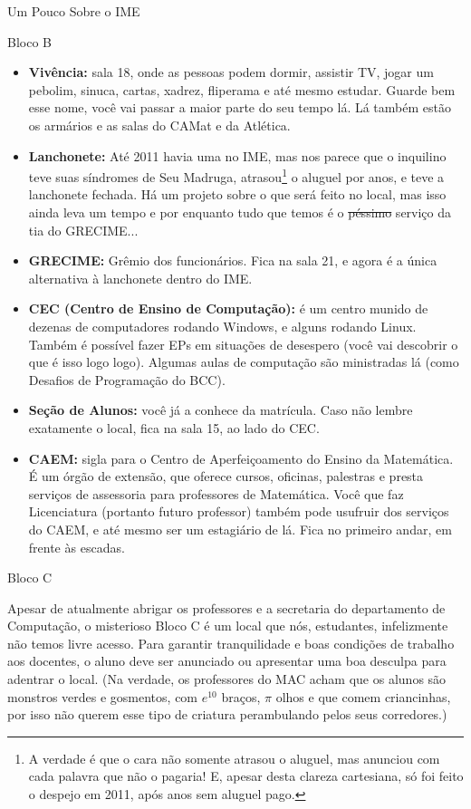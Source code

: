 \begin{secao}{Um Pouco Sobre o IME}
\begin{subsecao}{Bloco B}
\begin{itemize}
\item {\bf Vivência:} sala 18, onde as pessoas podem dormir, assistir TV, jogar
um pebolim, sinuca, cartas, xadrez, fliperama e até mesmo estudar. Guarde bem
esse nome, você vai passar a maior parte do seu tempo lá. Lá também estão os
armários e as salas do CAMat e da Atlética. 

\item {\bf Lanchonete:} Até 2011 havia uma no IME, mas nos parece que o inquilino
teve suas síndromes de Seu Madruga, atrasou\footnote{A verdade é que o cara não
somente atrasou o aluguel, mas anunciou com cada palavra que não o pagaria! E,
apesar desta clareza cartesiana, só foi feito o despejo em 2011, após anos sem
aluguel pago.} o aluguel por anos, e teve a lanchonete fechada. Há um projeto
sobre o que será feito no local, mas isso ainda leva um tempo e por enquanto
tudo que temos é o \sout{péssimo} serviço da tia do GRECIME... 

\item {\bf GRECIME:} Grêmio dos funcionários. Fica na sala 21, e agora é a única
alternativa à lanchonete dentro do IME.

\item {\bf CEC (Centro de Ensino de Computação):} é um centro munido de dezenas
de computadores rodando Windows, e alguns rodando Linux. Também é possível fazer
EPs em situações de desespero (você vai descobrir o que é isso logo logo). Algumas
aulas de computação são ministradas lá (como Desafios de Programação do BCC).
 
\item {\bf Seção de Alunos:} você já a conhece da matrícula. Caso não lembre
exatamente o local, fica na sala 15, ao lado do CEC.

\item {\bf CAEM:} sigla para o Centro de Aperfeiçoamento do Ensino da Matemática.
É um órgão de extensão, que oferece cursos, oficinas, palestras e presta serviços
de assessoria para professores de Matemática. Você que faz Licenciatura (portanto
futuro professor) também pode usufruir dos serviços do CAEM, e até mesmo ser um
estagiário de lá. Fica no primeiro andar, em frente às escadas.

\end{itemize}
\end{subsecao}

\begin{subsecao}{Bloco C}

Apesar de atualmente abrigar os professores e a secretaria do departamento de
Computação, o misterioso Bloco C é um local que nós, estudantes, infelizmente não
temos livre acesso. Para garantir tranquilidade e boas condições de trabalho aos
docentes, o aluno deve ser anunciado ou apresentar uma boa desculpa para adentrar
o local. (Na verdade, os professores do MAC acham que os alunos são monstros
verdes e gosmentos, com $e^{10}$ braços, $\pi$ olhos e que comem criancinhas,
por isso não querem esse tipo de criatura perambulando pelos seus corredores.)


\end{subsecao}
\end{secao}
